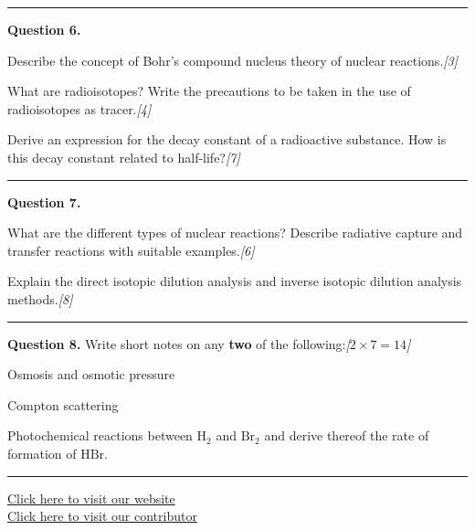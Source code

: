 \documentclass[11pt,a4paper]{article}
\newcommand{\pts}[1]{\hfill   \textit{[#1]}}
\begin{document}
\medskip\rule{\linewidth}{0.2pt}\medskip




\noindent   \textbf{Question 6.}

\begin{parts}
  \item Describe the concept of Bohr's compound nucleus theory of nuclear reactions.\pts{3}
  \item What are radioisotopes? Write the precautions to be taken in the use of radioisotopes as tracer.\pts{4}
  \item Derive an expression for the decay constant of a radioactive substance. How is this decay constant related to half-life?\pts{7}
\end{parts}

\medskip\rule{\linewidth}{0.2pt}\medskip




\noindent   \textbf{Question 7.}

\begin{parts}
  \item What are the different types of nuclear reactions? Describe radiative capture and transfer reactions with suitable examples.\pts{6}
  \item Explain the direct isotopic dilution analysis and inverse isotopic dilution analysis methods.\pts{8}
\end{parts}

\medskip\rule{\linewidth}{0.2pt}\medskip




\noindent   \textbf{Question 8.} Write short notes on any   \textbf{two} of the following:\pts{$2  \times 7 = 14$}

\begin{parts}
  \item Osmosis and osmotic pressure
  \item Compton scattering
  \item Photochemical reactions between $ \text{H}_2$ and $ \text{Br}_2$ and derive thereof the rate of formation of $ \text{HBr}$.
\end{parts}

\vfill
\rule{\linewidth}{0.4pt}

\begin{center}\small
\href{https://bhu-exam.vercel.app/}{Click here to visit our website}\\[4pt]
\href{https://me-aryan.vercel.app/}{Click here to visit our contributor}
\end{center}
\end{document}
